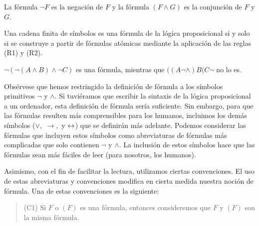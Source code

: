 \message{ !name(main.tex)}\documentclass[12pt,a4paper]{book}
\begin{document}
    \begin{definicion}
        La fórmula $\neg F$ es la negación de $F$ y la fórmula $(F\wedge G)$ es la conjunción de $F$ y $G$.
    \end{definicion}

    \begin{definicion}
        Una cadena finita de símbolos es una fórmula de la lógica proposicional si y solo si se construye a partir de fórmulas atómicas
        mediante la aplicación de las reglas (R1) y (R2).
    \end{definicion}

    \begin{ejemplo}
        $\neg(\neg(A\wedge B)\wedge\neg C)$ es una fórmula, mientras que $((A\neg\wedge)B(C\neg$ no lo es.
    \end{ejemplo}

    Obsérvese que hemos restringido la definición de fórmula a los símbolos primitivos $\neg$ y $\wedge$. Si tuviéramos que escribir
    la sintaxis de la lógica proposicional a un ordenador, esta definición de fórmula sería suficiente. Sin embargo, para que las fórmulas
    resulten más comprensibles para los humanos, incluimos los demás símbolos ($\vee,$ $\rightarrow,$ y $\leftrightarrow$) que se definirán más adelante.
    Podemos considerar las fórmulas que incluyen estos símbolos como abreviaturas de fórmulas más complicadas que solo contienen
    $\neg$ y $\wedge$. La inclusión de estos símbolos hace que las fórmulas sean más fáciles de leer (para nosotros, los humanos).

    \vspace{2cm}

    Asimismo, con el fin de facilitar la lectura, utilizamos ciertas convenciones. El uso de estas abreviaturas y convenciones modifica
    en cierta medida nuestra noción de fórmula. Una de estas convenciones es la siguiente:

    \begin{quote}
        (C1) Si $F$ o $(F)$ es una fórmula, entonces consideremos que $F$ y $(F)$ son la misma fórmula.
    \end{quote}
\end{document}
